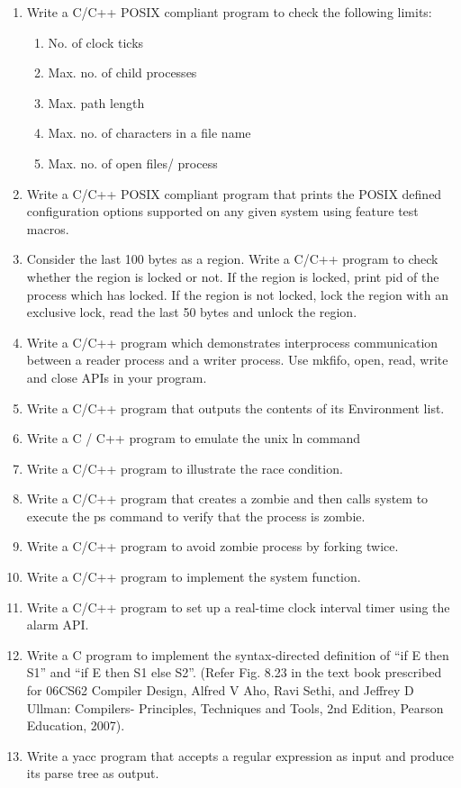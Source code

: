\begin{enumerate}
\item
  Write a C/C++ POSIX compliant program to check the following limits:
  \begin{enumerate}
	\item No. of clock ticks
	\item Max. no. of child processes
	\item Max. path length
	\item Max. no. of characters in a file name
	\item Max. no. of open files/ process
  \end{enumerate}
\item
  Write a C/C++ POSIX compliant program that prints the POSIX defined
  configuration options supported on any given system using feature test
  macros.
\item
  Consider the last 100 bytes as a region. Write a C/C++ program to
  check whether the region is locked or not. If the region is locked,
  print pid of the process which has locked. If the region is not
  locked, lock the region with an exclusive lock, read the last 50 bytes
  and unlock the region.
\item
  Write a C/C++ program which demonstrates interprocess communication
  between a reader process and a writer process. Use mkfifo, open, read,
  write and close APIs in your program.
\item
  Write a C/C++ program that outputs the contents of its Environment
  list.
\item
  Write a C / C++ program to emulate the unix ln command
\item
  Write a C/C++ program to illustrate the race condition.
\item
  Write a C/C++ program that creates a zombie and then calls system to
  execute the ps command to verify that the process is zombie.
\item
  Write a C/C++ program to avoid zombie process by forking twice.
\item
  Write a C/C++ program to implement the system function.
\item
  Write a C/C++ program to set up a real-time clock interval timer using
  the alarm API.
\item
  Write a C program to implement the syntax-directed definition of ``if
  E then S1'' and ``if E then S1 else S2''. (Refer Fig. 8.23 in the text
  book prescribed for 06CS62 Compiler Design, Alfred V Aho, Ravi Sethi,
  and Jeffrey D Ullman: Compilers- Principles, Techniques and Tools, 2nd
  Edition, Pearson Education, 2007).
\item
  Write a yacc program that accepts a regular expression as input and
  produce its parse tree as output.
\end{enumerate}
